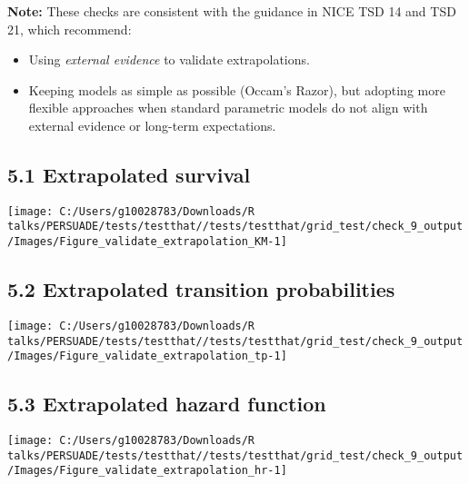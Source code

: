 \documentclass[
]{article}
\providecommand{\tightlist}{%
  \setlength{\itemsep}{0pt}\setlength{\parskip}{0pt}}
\begin{document}
\textbf{Note:} These checks are consistent with the guidance in NICE TSD
14 and TSD 21, which recommend:

\begin{itemize}
\tightlist
\item
  Using \emph{external evidence} to validate extrapolations.\\
\item
  Keeping models as simple as possible (Occam's Razor), but adopting
  more flexible approaches when standard parametric models do not align
  with external evidence or long-term expectations.
\end{itemize}

\subsection{5.1 Extrapolated survival}\label{extrapolated-survival}

\begin{flushleft}\texttt{[image: C:/Users/g10028783/Downloads/R talks/PERSUADE/tests/testthat//tests/testthat/grid\_test/check\_9\_output/Images/Figure\_validate\_extrapolation\_KM-1]} \end{flushleft}

\clearpage

\subsection{5.2 Extrapolated transition
probabilities}\label{extrapolated-transition-probabilities}

\begin{flushleft}\texttt{[image: C:/Users/g10028783/Downloads/R talks/PERSUADE/tests/testthat//tests/testthat/grid\_test/check\_9\_output/Images/Figure\_validate\_extrapolation\_tp-1]} \end{flushleft}

\clearpage

\subsection{5.3 Extrapolated hazard
function}\label{extrapolated-hazard-function}

\begin{flushleft}\texttt{[image: C:/Users/g10028783/Downloads/R talks/PERSUADE/tests/testthat//tests/testthat/grid\_test/check\_9\_output/Images/Figure\_validate\_extrapolation\_hr-1]} \end{flushleft}
\end{document}
